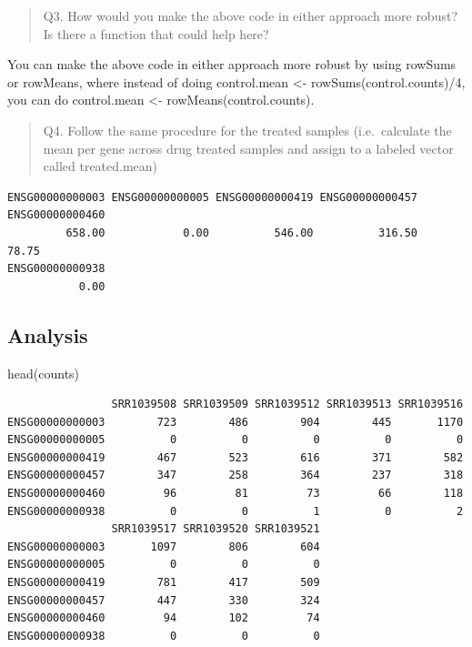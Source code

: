 \documentclass[
  letterpaper,
  DIV=11,
  numbers=noendperiod]{scrartcl}
\newenvironment{Shaded}{\begin{snugshade}}{\end{snugshade}}
\newcommand{\FunctionTok}[1]{\textcolor[rgb]{0.28,0.35,0.67}{#1}}
\newcommand{\NormalTok}[1]{\textcolor[rgb]{0.00,0.23,0.31}{#1}}
\newcommand{\OtherTok}[1]{\textcolor[rgb]{0.00,0.23,0.31}{#1}}
\newcommand{\SpecialCharTok}[1]{\textcolor[rgb]{0.37,0.37,0.37}{#1}}
\newcommand{\StringTok}[1]{\textcolor[rgb]{0.13,0.47,0.30}{#1}}
\begin{document}
\begin{quote}
Q3. How would you make the above code in either approach more robust? Is
there a function that could help here?
\end{quote}

You can make the above code in either approach more robust by using
rowSums or rowMeans, where instead of doing control.mean \textless-
rowSums(control.counts)/4, you can do control.mean \textless-
rowMeans(control.counts).

\begin{quote}
Q4. Follow the same procedure for the treated samples (i.e.~calculate
the mean per gene across drug treated samples and assign to a labeled
vector called treated.mean)
\end{quote}

\begin{Shaded}
\end{Shaded}

\begin{verbatim}
ENSG00000000003 ENSG00000000005 ENSG00000000419 ENSG00000000457 ENSG00000000460 
         658.00            0.00          546.00          316.50           78.75 
ENSG00000000938 
           0.00 
\end{verbatim}

\subsection{Analysis}\label{analysis}

\begin{Shaded}
\begin{Highlighting}[]
\FunctionTok{head}\NormalTok{(counts)}
\end{Highlighting}
\end{Shaded}

\begin{verbatim}
                SRR1039508 SRR1039509 SRR1039512 SRR1039513 SRR1039516
ENSG00000000003        723        486        904        445       1170
ENSG00000000005          0          0          0          0          0
ENSG00000000419        467        523        616        371        582
ENSG00000000457        347        258        364        237        318
ENSG00000000460         96         81         73         66        118
ENSG00000000938          0          0          1          0          2
                SRR1039517 SRR1039520 SRR1039521
ENSG00000000003       1097        806        604
ENSG00000000005          0          0          0
ENSG00000000419        781        417        509
ENSG00000000457        447        330        324
ENSG00000000460         94        102         74
ENSG00000000938          0          0          0
\end{verbatim}
\end{document}
